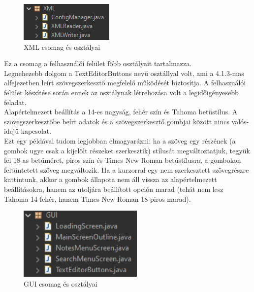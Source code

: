 \begin{figure}[h]
	\centering
	\includegraphics[scale=0.7]{images/package_xml.png}
	\caption{XML csomag és osztályai}
	\label{fig:package_xml}
\end{figure}

Ez a csomag a felhasználói felület főbb osztályait tartalmazza.
\vspace{5pt}\\Legnehezebb dolgom a TextEditorButtons nevű osztállyal volt, ami a 4.1.3-mas alfejezetben leírt szövegszerkesztő megfelelő működését biztosítja. A felhasználói felület készítése során ennek az osztálynak létrehozása volt a legidőigényesebb feladat.
\\Alapértelmezett beállítás a 14-es nagyság, fehér szín és Tahoma betűstílus. A szövegszerkesztőbe beírt adatok és a szövegszerkesztő gombjai között nincs valós-idejű kapcsolat.
\\Ezt egy példával tudom legjobban elmagyarázni: ha a szöveg egy részének (a gombok ugye csak a kijelölt részeket szerkesztik) stílusát megváltoztatjuk, tegyük fel 18-as betűméret, piros szín és Times New Roman betűstílusra, a gombokon feltüntetett szöveg megváltozik. Ha a kurzorral egy nem szerkesztett szövegrészre kattintunk, akkor a gombok állapota nem áll vissza az alapértelmezett beállításokra, hanem az utoljára beállított opción marad (tehát nem lesz Tahoma-14-fehér, hanem Times New Roman-18-piros marad).

\begin{figure}[h]
	\centering
	\includegraphics[scale=0.7]{images/package_gui.png}
	\caption{GUI csomag és osztályai}
	\label{fig:package_gui}
\end{figure}


